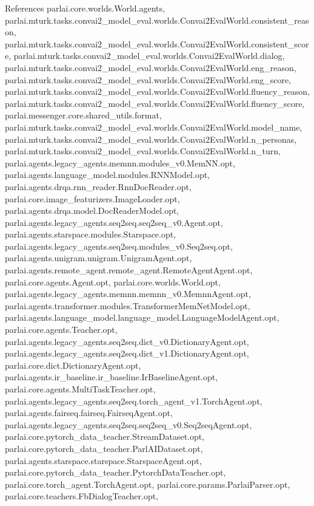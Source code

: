 References parlai.\+core.\+worlds.\+World.\+agents, parlai.\+mturk.\+tasks.\+convai2\+\_\+model\+\_\+eval.\+worlds.\+Convai2\+Eval\+World.\+consistent\+\_\+reason, parlai.\+mturk.\+tasks.\+convai2\+\_\+model\+\_\+eval.\+worlds.\+Convai2\+Eval\+World.\+consistent\+\_\+score, parlai.\+mturk.\+tasks.\+convai2\+\_\+model\+\_\+eval.\+worlds.\+Convai2\+Eval\+World.\+dialog, parlai.\+mturk.\+tasks.\+convai2\+\_\+model\+\_\+eval.\+worlds.\+Convai2\+Eval\+World.\+eng\+\_\+reason, parlai.\+mturk.\+tasks.\+convai2\+\_\+model\+\_\+eval.\+worlds.\+Convai2\+Eval\+World.\+eng\+\_\+score, parlai.\+mturk.\+tasks.\+convai2\+\_\+model\+\_\+eval.\+worlds.\+Convai2\+Eval\+World.\+fluency\+\_\+reason, parlai.\+mturk.\+tasks.\+convai2\+\_\+model\+\_\+eval.\+worlds.\+Convai2\+Eval\+World.\+fluency\+\_\+score, parlai.\+messenger.\+core.\+shared\+\_\+utils.\+format, parlai.\+mturk.\+tasks.\+convai2\+\_\+model\+\_\+eval.\+worlds.\+Convai2\+Eval\+World.\+model\+\_\+name, parlai.\+mturk.\+tasks.\+convai2\+\_\+model\+\_\+eval.\+worlds.\+Convai2\+Eval\+World.\+n\+\_\+personas, parlai.\+mturk.\+tasks.\+convai2\+\_\+model\+\_\+eval.\+worlds.\+Convai2\+Eval\+World.\+n\+\_\+turn, parlai.\+agents.\+legacy\+\_\+agents.\+memnn.\+modules\+\_\+v0.\+Mem\+N\+N.\+opt, parlai.\+agents.\+language\+\_\+model.\+modules.\+R\+N\+N\+Model.\+opt, parlai.\+agents.\+drqa.\+rnn\+\_\+reader.\+Rnn\+Doc\+Reader.\+opt, parlai.\+core.\+image\+\_\+featurizers.\+Image\+Loader.\+opt, parlai.\+agents.\+drqa.\+model.\+Doc\+Reader\+Model.\+opt, parlai.\+agents.\+legacy\+\_\+agents.\+seq2seq.\+seq2seq\+\_\+v0.\+Agent.\+opt, parlai.\+agents.\+starspace.\+modules.\+Starspace.\+opt, parlai.\+agents.\+legacy\+\_\+agents.\+seq2seq.\+modules\+\_\+v0.\+Seq2seq.\+opt, parlai.\+agents.\+unigram.\+unigram.\+Unigram\+Agent.\+opt, parlai.\+agents.\+remote\+\_\+agent.\+remote\+\_\+agent.\+Remote\+Agent\+Agent.\+opt, parlai.\+core.\+agents.\+Agent.\+opt, parlai.\+core.\+worlds.\+World.\+opt, parlai.\+agents.\+legacy\+\_\+agents.\+memnn.\+memnn\+\_\+v0.\+Memnn\+Agent.\+opt, parlai.\+agents.\+transformer.\+modules.\+Transformer\+Mem\+Net\+Model.\+opt, parlai.\+agents.\+language\+\_\+model.\+language\+\_\+model.\+Language\+Model\+Agent.\+opt, parlai.\+core.\+agents.\+Teacher.\+opt, parlai.\+agents.\+legacy\+\_\+agents.\+seq2seq.\+dict\+\_\+v0.\+Dictionary\+Agent.\+opt, parlai.\+agents.\+legacy\+\_\+agents.\+seq2seq.\+dict\+\_\+v1.\+Dictionary\+Agent.\+opt, parlai.\+core.\+dict.\+Dictionary\+Agent.\+opt, parlai.\+agents.\+ir\+\_\+baseline.\+ir\+\_\+baseline.\+Ir\+Baseline\+Agent.\+opt, parlai.\+core.\+agents.\+Multi\+Task\+Teacher.\+opt, parlai.\+agents.\+legacy\+\_\+agents.\+seq2seq.\+torch\+\_\+agent\+\_\+v1.\+Torch\+Agent.\+opt, parlai.\+agents.\+fairseq.\+fairseq.\+Fairseq\+Agent.\+opt, parlai.\+agents.\+legacy\+\_\+agents.\+seq2seq.\+seq2seq\+\_\+v0.\+Seq2seq\+Agent.\+opt, parlai.\+core.\+pytorch\+\_\+data\+\_\+teacher.\+Stream\+Dataset.\+opt, parlai.\+core.\+pytorch\+\_\+data\+\_\+teacher.\+Parl\+A\+I\+Dataset.\+opt, parlai.\+agents.\+starspace.\+starspace.\+Starspace\+Agent.\+opt, parlai.\+core.\+pytorch\+\_\+data\+\_\+teacher.\+Pytorch\+Data\+Teacher.\+opt, parlai.\+core.\+torch\+\_\+agent.\+Torch\+Agent.\+opt, parlai.\+core.\+params.\+Parlai\+Parser.\+opt, parlai.\+core.\+teachers.\+Fb\+Dialog\+Teacher.\+opt, 